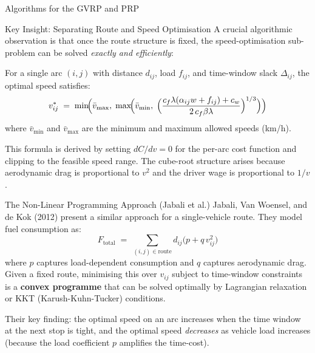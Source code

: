 \documentclass[aspectratio=169,10pt]{beamer}
\begin{document}
\begin{frame}[allowframebreaks]{Algorithms for the GVRP and PRP}
  \framebreak

  \begin{alertblock}{Key Insight: Separating Route and Speed Optimisation}
    A crucial algorithmic observation is that once the route structure is fixed,
    the speed-optimisation sub-problem can be solved \emph{exactly and efficiently}:

    For a single arc $(i,j)$ with distance $d_{ij}$, load $f_{ij}$,
    and time-window slack $\Delta_{ij}$, the optimal speed satisfies:
    \[
      v_{ij}^* \;=\; \min\!\Bigl(\bar{v}_{\max},\;
      \max\!\Bigl(\bar{v}_{\min},\;
      \Bigl(\frac{c_f \lambda(\alpha_{ij} w + f_{ij}) + c_w}{2\, c_f \beta \lambda}\Bigr)^{1/3}
      \Bigr)\Bigr)
    \]
    where $\bar{v}_{\min}$ and $\bar{v}_{\max}$ are the minimum and maximum
    allowed speeds (km/h).

    This formula is derived by setting $dC/dv = 0$ for the per-arc cost
    function and clipping to the feasible speed range.  The cube-root structure
    arises because aerodynamic drag is proportional to $v^2$ and the driver
    wage is proportional to $1/v$.
  \end{alertblock}

  \framebreak

  \begin{block}{The Non-Linear Programming Approach (Jabali et al.)}
    Jabali, Van Woensel, and de Kok (2012) present a similar approach for a
    single-vehicle route.  They model fuel consumption as:
    \[
      F_\text{total} \;=\; \sum_{(i,j)\in\text{route}} d_{ij}\bigl(p + q\,v_{ij}^2\bigr)
    \]
    where $p$ captures load-dependent consumption and $q$ captures
    aerodynamic drag.  Given a fixed route, minimising this over $v_{ij}$
    subject to time-window constraints is a \textbf{convex programme} that can
    be solved optimally by Lagrangian relaxation or KKT (Karush-Kuhn-Tucker)
    conditions.

    Their key finding: the optimal speed on an arc increases when the time
    window at the next stop is tight, and the optimal speed \emph{decreases}
    as vehicle load increases (because the load coefficient $p$ amplifies the
    time-cost).
  \end{block}

  \framebreak


\end{frame}
\end{document}
